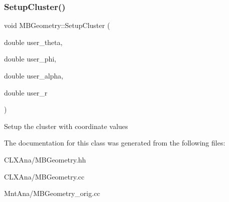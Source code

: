 \subsubsection{\texorpdfstring{Setup\+Cluster()}{SetupCluster()}\hspace{0.1cm}{\footnotesize\ttfamily [2/2]}}
{\footnotesize\ttfamily void M\+B\+Geometry\+::\+Setup\+Cluster (\begin{DoxyParamCaption}\item[{double}]{user\+\_\+theta,  }\item[{double}]{user\+\_\+phi,  }\item[{double}]{user\+\_\+alpha,  }\item[{double}]{user\+\_\+r }\end{DoxyParamCaption})}

Setup the cluster with coordinate values 

The documentation for this class was generated from the following files\+:\begin{DoxyCompactItemize}
\item 
C\+L\+X\+Ana/M\+B\+Geometry.\+hh\item 
C\+L\+X\+Ana/M\+B\+Geometry.\+cc\item 
Mnt\+Ana/M\+B\+Geometry\+\_\+orig.\+cc\end{DoxyCompactItemize}
